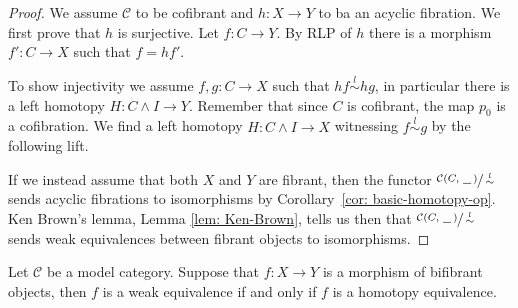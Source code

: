 \documentclass[../thesis.tex]{subfiles}
\begin{document}
            \begin{proof}
                We assume $\mathcal{C}$ to be cofibrant and $h:X\rightarrow Y$ to ba an acyclic fibration. We first prove that $h$ is surjective. Let $f:C\rightarrow Y$. By RLP of $h$ there is a morphism $f':C\rightarrow X$ such that $f = hf'$.
                \begin{center}
                \end{center}
                
                To show injectivity we assume $f,g:C\rightarrow X$ such that $hf\overset{l}{\sim} hg$, in particular there is a left homotopy $H:C\wedge I \rightarrow Y$. Remember that since $C$ is cofibrant, the map $p_0$ is a cofibration. We find a left homotopy $H:C\wedge I \rightarrow X$ witnessing $f\overset{l}{\sim} g$ by the following lift.
                \begin{center}
                \end{center}

                If we instead assume that both $X$ and $Y$ are fibrant, then the functor $\sfrac{\mathcal{C}(C,\hspace{0.05cm}\underline{\hspace{0.2cm}}\hspace{0.05cm})}{\overset{l}{\sim}}$ sends acyclic fibrations to isomorphisms by Corollary~\ref{cor: basic-homotopy-op}. Ken Brown's lemma, Lemma \ref{lem: Ken-Brown}, tells us then that $\sfrac{\mathcal{C}(C,\hspace{0.05cm}\underline{\hspace{0.2cm}}\hspace{0.05cm})}{\overset{l}{\sim}}$ sends weak equivalences between fibrant objects to isomorphisms.
            \end{proof}

            \begin{thm}\label{thm: Whitehead}
                Let $\mathcal{C}$ be a model category. Suppose that $f : X \rightarrow Y$ is a morphism of bifibrant objects, then $f$ is a weak equivalence if and only if $f$ is a homotopy equivalence.
            \end{thm}
\end{document}
